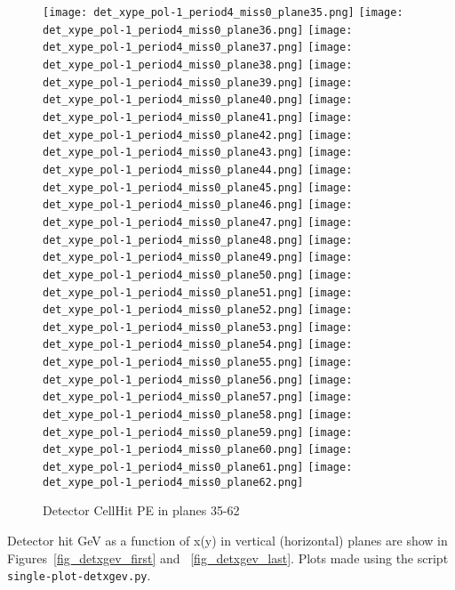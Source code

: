   
        \begin{figure}[h]	   
 \centering
        	\texttt{[image: det\_xype\_pol-1\_period4\_miss0\_plane35.png]}
	 	\texttt{[image: det\_xype\_pol-1\_period4\_miss0\_plane36.png]}
		 	\texttt{[image: det\_xype\_pol-1\_period4\_miss0\_plane37.png]}
			 	\texttt{[image: det\_xype\_pol-1\_period4\_miss0\_plane38.png]}
				\texttt{[image: det\_xype\_pol-1\_period4\_miss0\_plane39.png]}	 
        	\texttt{[image: det\_xype\_pol-1\_period4\_miss0\_plane40.png]}
	 	\texttt{[image: det\_xype\_pol-1\_period4\_miss0\_plane41.png]}
		 	\texttt{[image: det\_xype\_pol-1\_period4\_miss0\_plane42.png]}
			 	\texttt{[image: det\_xype\_pol-1\_period4\_miss0\_plane43.png]}
				\texttt{[image: det\_xype\_pol-1\_period4\_miss0\_plane44.png]}					
        	\texttt{[image: det\_xype\_pol-1\_period4\_miss0\_plane45.png]}
	 	\texttt{[image: det\_xype\_pol-1\_period4\_miss0\_plane46.png]}
		 	\texttt{[image: det\_xype\_pol-1\_period4\_miss0\_plane47.png]}
			 	\texttt{[image: det\_xype\_pol-1\_period4\_miss0\_plane48.png]}
				\texttt{[image: det\_xype\_pol-1\_period4\_miss0\_plane49.png]}
        	\texttt{[image: det\_xype\_pol-1\_period4\_miss0\_plane50.png]}
	 	\texttt{[image: det\_xype\_pol-1\_period4\_miss0\_plane51.png]}
		 	\texttt{[image: det\_xype\_pol-1\_period4\_miss0\_plane52.png]}
			 	\texttt{[image: det\_xype\_pol-1\_period4\_miss0\_plane53.png]}
				\texttt{[image: det\_xype\_pol-1\_period4\_miss0\_plane54.png]}
        	\texttt{[image: det\_xype\_pol-1\_period4\_miss0\_plane55.png]}
	 	\texttt{[image: det\_xype\_pol-1\_period4\_miss0\_plane56.png]}
		 	\texttt{[image: det\_xype\_pol-1\_period4\_miss0\_plane57.png]}
			 	\texttt{[image: det\_xype\_pol-1\_period4\_miss0\_plane58.png]}
				\texttt{[image: det\_xype\_pol-1\_period4\_miss0\_plane59.png]}
        	\texttt{[image: det\_xype\_pol-1\_period4\_miss0\_plane60.png]}
	 	\texttt{[image: det\_xype\_pol-1\_period4\_miss0\_plane61.png]}
		 	\texttt{[image: det\_xype\_pol-1\_period4\_miss0\_plane62.png]}
\caption{Detector CellHit PE in planes 35-62}			
   \label{fig_detxpe_last}
  \end{figure}

Detector hit GeV as a function of x(y) in vertical (horizontal) planes are show in Figures~\ref{fig_detxgev_first} and ~\ref{fig_detxgev_last}. Plots made using the script \texttt{single-plot-detxgev.py}.
  
